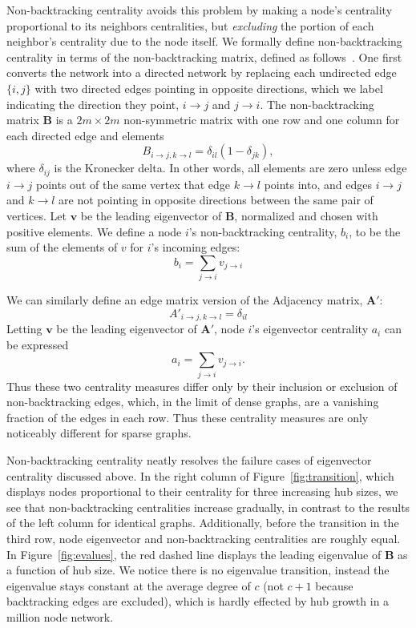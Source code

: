 \documentclass[twocolumn,prl,superscriptaddress]{revtex4}
\newcommand{\mat}{\mathbf}
\renewcommand{\vec}{\mathbf}
\newcommand\colorb{red }
\begin{document}
Non-backtracking centrality avoids this problem by making a node's centrality proportional to its neighbors centralities, but \emph{excluding} the portion of each neighbor's centrality due to the node itself. We formally define non-backtracking centrality in terms of the non-backtracking matrix, defined as follows~\cite{newman13}. One first converts the network into a directed network by replacing each undirected edge $\{i, j\}$ with two directed edges pointing in opposite directions, which we label indicating the direction they point, $i \rightarrow j$ and $j \rightarrow i$. The non-backtracking matrix $\mat{B}$ is a $2m \times 2m$ non-symmetric matrix with one row and one column for each directed edge and elements
\begin{equation}
B_{i\rightarrow j, k \rightarrow l} = \delta_{il}(1-\delta_{jk}),
\end{equation}
where $\delta_{ij}$ is the Kronecker delta. In other words, all elements are zero unless edge $i\rightarrow j$ points out of the same vertex that edge $k \rightarrow l$ points into, and edges $i \rightarrow j$ and $k \rightarrow l$ are not pointing in opposite directions between the same pair of vertices. Let $\vec{v}$ be the leading eigenvector of $\mat{B}$, normalized and chosen with positive elements. We define a node $i$'s non-backtracking centrality, $b_i$, to be the sum of the elements of $v$ for $i$'s incoming edges:
\begin{equation*}
b_i = \sum_{j\rightarrow i} v_{j\rightarrow i}
\end{equation*}

We can similarly define an edge matrix version of the Adjacency matrix, $\mat{A'}$:
\begin{equation*}
A'_{i\rightarrow j, k \rightarrow l} = \delta_{il}
\end{equation*}
Letting $\vec{v}$ be the leading eigenvector of $\mat{A'}$, node $i$'s eigenvector centrality $a_i$ can be expressed
\begin{equation}
a_i = \sum_{j\rightarrow i} v_{j\rightarrow i}.
\end{equation}
Thus these two centrality measures differ only by their inclusion or exclusion of non-backtracking edges, which, in the limit of dense graphs, are a vanishing fraction of the edges in each row. Thus these centrality measures are only noticeably different for sparse graphs.

Non-backtracking centrality neatly resolves the failure cases of eigenvector centrality discussed above. In the right column of Figure~\ref{fig:transition}, which displays nodes proportional to their centrality for three increasing hub sizes, we see that non-backtracking centralities increase gradually, in contrast to the results of the left column for identical graphs. Additionally, before the transition in the third row, node eigenvector and non-backtracking centralities are roughly equal. In Figure~\ref{fig:evalues}, the \colorb dashed line displays the leading eigenvalue of $\mat{B}$ as a function of hub size. We notice there is no eigenvalue transition, instead the eigenvalue stays constant at the average degree of $c$ (not $c+1$ because backtracking edges are excluded), which is hardly effected by hub growth in a million node network.
\end{document}
